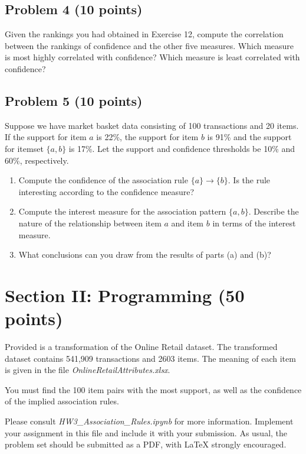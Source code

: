 \documentclass[12pt]{article}
\begin{document}
\subsection*{Problem 4 (10 points)}
Given the rankings you had obtained in Exercise 12, compute the correlation between the rankings of confidence and the other five measures. Which measure is most highly correlated with confidence? Which measure is least correlated with confidence?

\subsection*{Problem 5 (10 points)}
Suppose we have market basket data consisting of 100 transactions and 20 items. If the support for item $a$ is 22\%, the support for item $b$ is 91\% and the support for itemset $\{a, b\}$ is 17\%. Let the support and confidence thresholds be 10\% and 60\%, respectively.

\begin{enumerate}[label=(\alph*)]
  \item Compute the confidence of the association rule $\{a\} \longrightarrow \{b\}$. Is the rule interesting according to the confidence measure?
  \item Compute the interest measure for the association pattern $\{a, b\}$. Describe the nature of the relationship between item $a$ and item $b$ in terms of the interest measure.
  \item What conclusions can you draw from the results of parts (a) and (b)?
\end{enumerate}


\pagebreak

\section*{Section II: Programming (50 points)}

Provided is a transformation of the Online Retail dataset. The transformed dataset contains 541,909 transactions and 2603 items. The meaning of each item is given in the file \textit{OnlineRetailAttributes.xlsx}.

\vspace{5mm}

You must find the 100 item pairs with the most support, as well as the confidence of the implied association rules.

\vspace{5mm}

Please consult \textit{HW3\_Association\_Rules.ipynb} for more information. Implement your assignment in this file and include it with your submission. As usual, the problem set should be submitted as a PDF, with LaTeX strongly encouraged.
\end{document}
